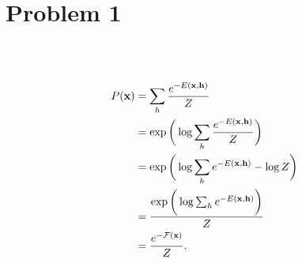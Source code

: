 \section{Problem 1}~\label{sec:prob1}

\subsection{} %

\begin{equation}
\begin{split}
    P({\mathbf{x}})
        &= \sum_h \frac{e^{-E({\mathbf{x}},{\mathbf{h}})}}{Z} \\
        &= \exp\bigg(\log\sum_h\frac{e^{-E({\mathbf{x}},{\mathbf{h}})}}{Z}\bigg) \\
        &= \exp\bigg(\log\sum_h e^{-E({\mathbf{x}},{\mathbf{h}})} - \log Z\bigg) \\
        &= \frac{\exp\bigg(\log\sum_h e^{-E({\mathbf{x}},{\mathbf{h}})}\bigg)}{Z} \\
        &= \frac{e^{-{\mathcal{F}}({\mathbf{x}})}}{Z}. \\
\end{split}
\end{equation}

\subsection{} %

\subsection{} %
